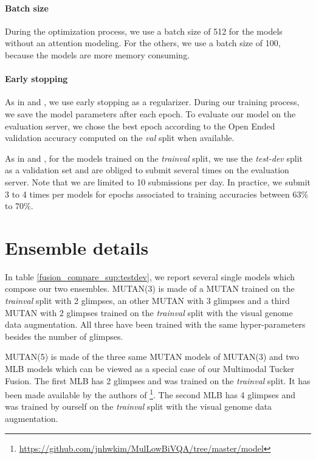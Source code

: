 \documentclass[10pt,twocolumn,letterpaper]{article}
\begin{document}
\paragraph{Batch size}
During the optimization process, we use a batch size of 512 for the models without an attention modeling. For the others, we use a batch size of 100, because the models are more memory consuming.

\paragraph{Early stopping}
As in \cite{fukui16mcb} and \cite{Kim2017}, we use early stopping as a regularizer. During our training process, we save the model parameters after each epoch. To evaluate our model on the evaluation server, we chose the best epoch according to the Open Ended validation accuracy computed on the \textit{val} split when available.

As in \cite{fukui16mcb} and \cite{Kim2017}, for the models trained on the \textit{trainval} split, we use the \textit{test-dev} split as a validation set and are obliged to submit several times on the evaluation server. Note that we are limited to 10 submissions per day. In practice, we submit 3 to 4 times per models for epochs associated to training accuracies between 63\% to 70\%.

\section*{Ensemble details}

In table \ref{fusion_compare_sup:testdev}, we report several single models which compose our two ensembles. MUTAN(3) is made of a MUTAN trained on the \textit{trainval} split with 2 glimpses, an other MUTAN with 3 glimpses and a third MUTAN with 2 glimpses trained on the \textit{trainval} split with the visual genome data augmentation. All three have been trained with the same hyper-parameters besides the number of glimpses.

MUTAN(5) is made of the three same MUTAN models of MUTAN(3) and two MLB models which can be viewed as a special case of our Multimodal Tucker Fusion. The first MLB has 2 glimpses and was trained on the \textit{trainval} split.  It has been made available by the authors of \cite{Kim2017} \footnote{\url{https://github.com/jnhwkim/MulLowBiVQA/tree/master/model}}. The second MLB has 4 glimpses and was trained by ourself on the \textit{trainval} split with the visual genome data augmentation.
\end{document}
